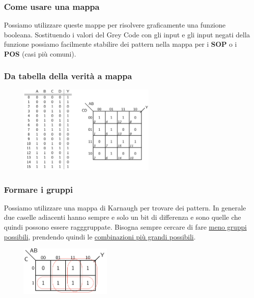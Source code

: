 \documentclass[../main.tex]{subfiles}
\begin{document}
\subsubsection{Come usare una mappa}
Possiamo utilizzare queste mappe per risolvere graficamente una funzione booleana. Sostituendo i valori del Grey Code con gli input e gli
input negati della funzione possiamo facilmente stabilire dei pattern nella mappa per i \textbf{SOP} o i \textbf{POS} (casi più comuni).

\vspace{1cm}
\subsubsection{Da tabella della verità a mappa}
\begin{figure}[h]
    \centering
    \includegraphics[width=0.6\textwidth]{images/tabellaMappa.png}
\end{figure}

\vspace{1cm}
\subsubsection{Formare i gruppi}
Possiamo utilizzare una mappa di Karnaugh per trovare dei pattern. In generale due caselle adiacenti hanno sempre e solo un bit di
differenza e sono quelle che quindi possono essere ragggruppate. Bisogna sempre cercare di fare \underline{meno gruppi possibili}, 
prendendo quindi le \underline{combinazioni più grandi possibili}.
\begin{figure}[h]
    \centering
    \includegraphics[width=0.4\textwidth]{images/gruppi.png}
\end{figure}
\end{document}
